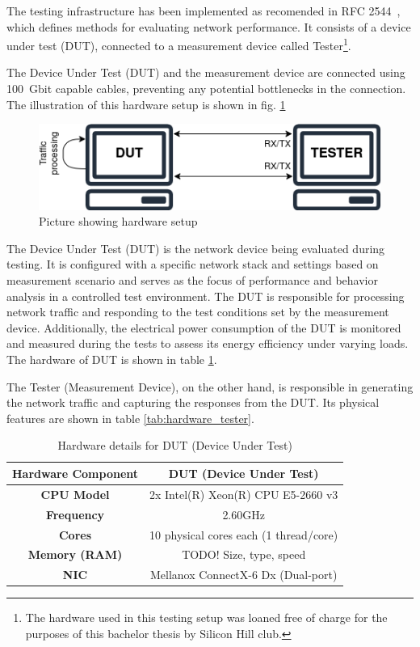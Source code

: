The testing infrastructure has been implemented as recomended in RFC 2544~\cite{rfc2544}, which defines methods for evaluating network performance. 
It consists of a device under test (DUT), connected to a measurement device called Tester\footnote{The hardware used in this testing setup was loaned free of charge for the purposes of this bachelor thesis by Silicon Hill club.}.

The Device Under Test (DUT) and the measurement device are connected using 100~Gbit capable cables, preventing any potential bottlenecks in the connection.
The illustration of this hardware setup is shown in fig. \ref{fig:hardware-setup}

\begin{figure}[!htbp]
    \centering
    \includegraphics[width=0.9\linewidth]{images/setup.png}
    \caption{Picture showing hardware setup}
    \label{fig:hardware-setup}
\end{figure}

The Device Under Test (DUT) is the network device being evaluated during testing. 
It is configured with a specific network stack and settings based on measurement scenario 
and serves as the focus of performance and behavior analysis in a controlled test environment. 
The DUT is responsible for processing network traffic and responding to the test conditions set by the measurement device.
Additionally, the electrical power consumption of the DUT is monitored and measured during the tests to assess its energy efficiency under varying loads.
The hardware of DUT is shown in table \ref{tab:hardware_dut}.

\newpage
The Tester (Measurement Device), on the other hand, is responsible in generating the network traffic and capturing the responses from the DUT.
Its physical features are shown in table \ref{tab:hardware_tester}. 

\begin{table}[h!]
\centering
\caption{Hardware details for DUT (Device Under Test)}
\begin{tabular}{|c|c|}
\hline
\textbf{Hardware Component} & \textbf{DUT (Device Under Test)} \\
\hline
\textbf{CPU Model} & 2x Intel(R) Xeon(R) CPU E5-2660 v3 \\
\hline
\textbf{Frequency} & 2.60GHz \\
\hline
\textbf{Cores} & 10 physical cores each (1 thread/core) \\
\hline
\textbf{Memory (RAM)} & TODO! Size, type, speed \\
\hline
\textbf{NIC} & Mellanox ConnectX-6 Dx (Dual-port) \\
\hline
\end{tabular}
\label{tab:hardware_dut}
\end{table}


